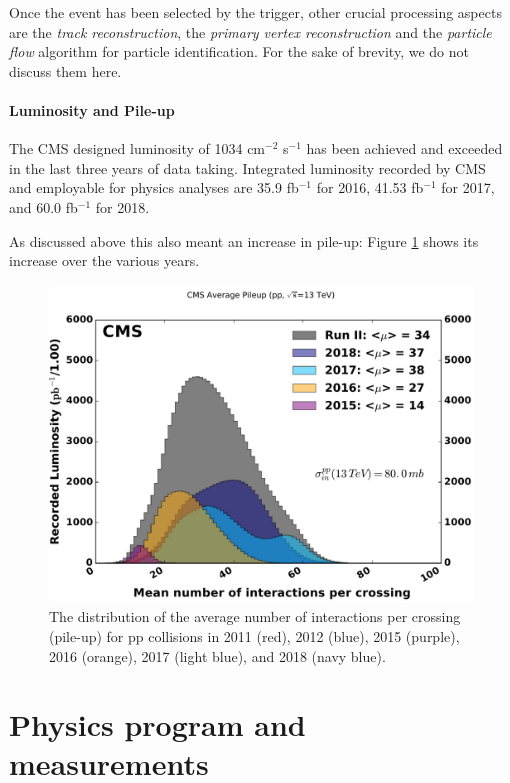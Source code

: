 Once the event has been selected by the trigger, other crucial processing aspects are the \emph{track reconstruction}, the \emph{primary vertex reconstruction} and the \emph{particle flow} algorithm for particle identification. For the sake of brevity, we do not discuss them here.

\paragraph{Luminosity and Pile-up}

 The CMS designed luminosity of 1034 cm$^{-2}$ s$^{-1}$ has been achieved and exceeded in the last three years of data taking. Integrated luminosity recorded by CMS and employable for physics analyses are 35.9 fb$^{-1}$ for 2016, 41.53 fb$^{-1}$ for 2017, and 60.0 fb$^{-1}$ for 2018.

As discussed above this also meant an increase in pile-up: Figure \ref{fig:pileup} shows its increase over the various years.

\begin{figure}
    \centering
     \includegraphics[width=\columnwidth]{gfx/ch1/pileup_allYears_run2.pdf}
    \caption[Pile-up]{The distribution of the average number of interactions per crossing (pile-up) for pp collisions in 2011 (red), 2012 (blue), 2015 (purple), 2016 (orange), 2017 (light blue), and 2018 (navy blue).}
    \label{fig:pileup}
\end{figure}

\section{Physics program and measurements}

